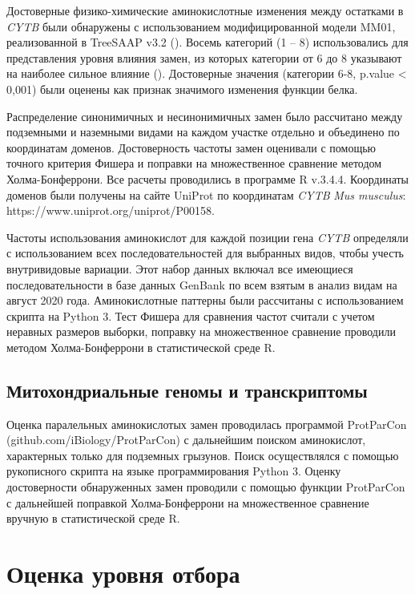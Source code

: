 Достоверные физико-химические аминокислотные изменения между остатками в \textit{CYTB} были обнаружены с использованием модифицированной модели MM01, реализованной в TreeSAAP v3.2 (\cite{Woolley2003}). Восемь категорий (1 -- 8) использовались для представления уровня влияния замен, из которых категории от 6 до 8 указывают на наиболее сильное влияние (\cite{McClellan2001}). Достоверные значения (категории 6-8, p.value < 0,001) были оценены как признак значимого изменения функции белка.

Распределение синонимичных и несинонимичных замен было рассчитано между подземными и наземными видами на каждом участке отдельно и объединено по координатам доменов. Достоверность частоты замен оценивали с помощью точного критерия Фишера и поправки на множественное сравнение методом Холма-Бонферрони. Все расчеты проводились в программе R v.3.4.4. Координаты доменов были получены на сайте UniProt по координатам \textit{CYTB} \textit{Mus musculus}: https://www.uniprot.org/uniprot/P00158.

Частоты использования аминокислот для каждой позиции гена \textit{CYTB} определяли с использованием всех последовательностей для выбранных видов, чтобы учесть внутривидовые вариации. Этот набор данных включал все имеющиеся последовательности в базе данных GenBank по всем взятым в анализ видам на август 2020 года. Аминокислотные паттерны были рассчитаны с использованием скрипта на Python 3. Тест Фишера для сравнения частот считали с учетом неравных размеров выборки, поправку на множественное сравнение проводили методом Холма-Бонферрони в статистической среде R.

\subsection{Митохондриальные геномы и транскриптомы}

Оценка паралельных аминокислотых замен проводилась программой ProtParCon (github.com/iBiology/ProtParCon) с дальнейшим поиском аминокислот, характерных только для подземных грызунов. Поиск осуществлялся с помощью рукописного скрипта на языке программирования Python 3. Оценку достоверности обнаруженных замен проводили с помощью функции ProtParCon с дальнейшей поправкой Холма-Бонферрони на множественное сравнение вручную в статистической среде R.  

\section{Оценка уровня отбора}

